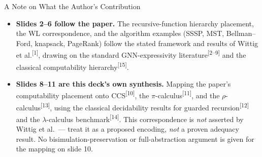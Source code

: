\documentclass[10pt,aspectratio=169,draft]{beamer}
\newcommand{\pcite}[1]{\textsuperscript{[#1]}}
\begin{document}
\begin{frame}{A Note on What the Author's Contribution}
  \begin{itemize}
    \item[{\color{ascTeal600}\checkmark}] \textbf{Slides 2--6 follow the paper.}
      The recursive-function hierarchy placement, the WL correspondence, and
      the algorithm examples (SSSP, MST, Bellman--Ford, knapsack, PageRank)
      follow the stated framework and results of Wittig et al.\pcite{1},
      drawing on the standard GNN-expressivity literature\pcite{2--9} and the
      classical computability hierarchy\pcite{15}.
    \item[{\color{ascSlate400}$\circ$}] \textbf{Slides 8--11 are this deck's own synthesis.}
      Mapping the paper's computability placement onto CCS\pcite{10}, the
      $\pi$-calculus\pcite{11}, and the $\rho$-calculus\pcite{13}, using the
      classical decidability results for guarded recursion\pcite{12} and the
      $\lambda$-calculus benchmark\pcite{14}. This correspondence is
      \emph{not} asserted by Wittig et al.\ --- treat it as a proposed
      encoding, \emph{not} a proven adequacy result. No
      bisimulation-preservation or full-abstraction argument is given for
      the mapping on slide 10.
  \end{itemize}
\end{frame}
\end{document}
